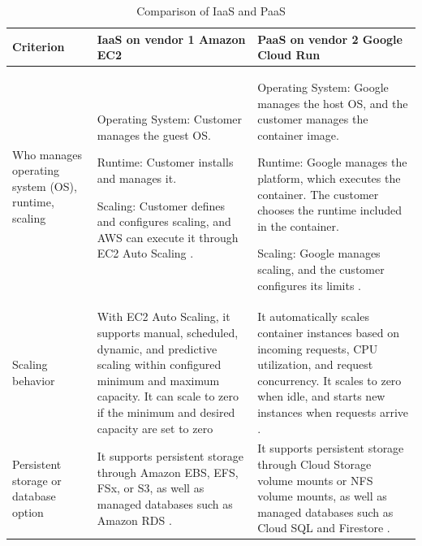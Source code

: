 \begin{longtable}{|P{3.5cm}|P{6cm}|P{6cm}|}
	\caption{Comparison of IaaS and PaaS}
	\label{tab:comparison-iaas-paas}
	\endfirsthead
	\endhead

	\hline
	Criterion
	 & IaaS on vendor 1 \newline Amazon EC2
	 & PaaS on vendor 2 \newline Google Cloud Run
	\\
	\hline
	Who manages operating system (OS), runtime, scaling
	 &
	\begin{tableitemize}
		\item Operating System: Customer manages the guest OS.
		\item Runtime: Customer installs and manages it.
		\item Scaling: Customer defines and configures scaling, and AWS can execute it through EC2 Auto Scaling \parencite{aws_shared_responsibility_model, aws_ec2_scaling_methods}.
	\end{tableitemize}
	 &
	\begin{tableitemize}
		\item Operating System: Google manages the host OS, and the customer manages the container image.
		\item Runtime: Google manages the platform, which executes the container. The customer chooses the runtime included in the container.
		\item Scaling: Google manages scaling, and the customer configures its limits \parencite{google_cloud_run_container_contract, google_cloud_run_autoscaling}.
	\end{tableitemize}
	\\
	\hline
	Scaling behavior
	 &
	With EC2 Auto Scaling, it supports manual, scheduled, dynamic, and predictive scaling within configured minimum and maximum capacity. It can scale to zero if the minimum and desired capacity are set to zero \parencite{aws_ec2_scaling_methods, aws_ec2_auto_scaling_capacity_limits}
	 &
	It automatically scales container instances based on incoming requests, CPU utilization, and request concurrency. It scales to zero when idle, and starts new instances when requests arrive \parencite{google_cloud_run_autoscaling}.
	\\
	\hline
	Persistent storage or database option
	 &
	It supports persistent storage through Amazon EBS, EFS, FSx, or S3, as well as managed databases such as Amazon RDS \parencite{aws_ec2_storage_options, aws_amazon_rds}.
	 &
	It supports persistent storage through Cloud Storage volume mounts or NFS volume mounts, as well as managed databases such as Cloud SQL and Firestore \parencite{google_cloud_run_cloud_storage_volumes, google_cloud_run_nfs_mounts, google_cloud_run_cloud_sql, google_cloud_firestore}.

\end{longtable}
